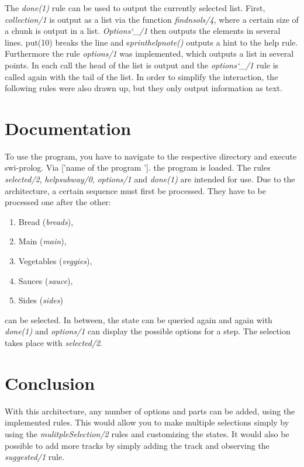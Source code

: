 \documentclass{article}
\begin{document}
	The \textit{done(1)} rule can be used to output the currently selected list. First, \textit{collection/1} is output as a list via the function \textit{findnsols/4}, where a certain size of a chunk is output in a list. \textit{Options\char`_/1} then outputs the elements in several lines. put(10) breaks the line and s\textit{printhelpnote()} outputs a hint to the help rule. Furthermore the rule \textit{options/1} was implemented, which outputs a list in several points. In each call the head of the list is output and the \textit{options\char`_/1} rule is called again with the tail of the list. 
	In order to simplify the interaction, the following rules were also drawn up, but they only output information as text.
	
	
	
	\section{Documentation}
	
	To use the program, you have to navigate to the respective directory and execute swi-prolog. Via ['name of the program ']. the program is loaded. The rules \textit{selected/2}, \textit{helpsubway/0}, \textit{options/1} and \textit{done(1)} are intended for use. Due to the architecture, a certain sequence must first be processed. They have to be processed one after the other:
	\begin{enumerate}
		\item Bread (\textit{breads}),
		\item Main (\textit{main}), 
		\item Vegetables (\textit{veggies}), 
		\item Sauces (\textit{sauce}),
		\item Sides (\textit{sides})
	\end{enumerate}
	 can be selected. In between, the state can be queried again and again with \textit{done(1)} and \textit{options/1} can display the possible options for a step. The selection takes place with \textit{selected/2}.
	
	\section{Conclusion}
	With this architecture, any number of options and parts can be added, using the implemented rules. This would allow you to make multiple selections simply by using the \textit{mulitpleSelection/2} rules and customizing the states. It would also be possible to add more tracks by simply adding the track and observing the \textit{suggested/1} rule.
\end{document}
